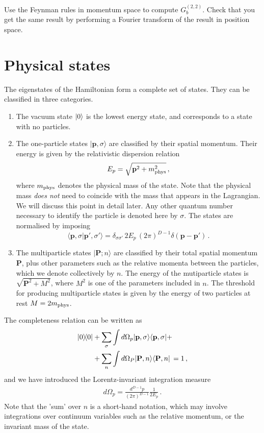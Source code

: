\documentclass[notes]{subfiles}
\begin{document}
\begin{Ex}
  Use the Feynman rules in momentum space to compute
  $G^{(2,2)}_b$. Check that you get the same result by performing a
  Fourier transform of the result in position space.
\end{Ex}

\section{Physical states}
\label{sec:physical-states}

The eigenstates of the Hamiltonian form a complete set of states. They
can be classified in three categories.
\begin{enumerate}
\item The vacuum state $\ket{0}$ is the lowest energy state, and
  corresponds to a state with no particles.
\item The one-particle states $|\mathbf{p},\sigma\rangle$ are
  classified by their spatial momentum. Their energy is given by the
  relativistic dispersion relation 
  \begin{equation}
    \label{eq:RelDispRel}
    E_p = \sqrt{\mathbf{p}^2 + m_\mathrm{phys}^2}\, ,
  \end{equation}
  where $m_\mathrm{phys}$ denotes the physical mass of the state. Note that the
  physical mass \emph{does not} need to coincide with the mass that
  appears in the Lagrangian. We will discuss this point in detail
  later. Any other quantum number necessary to identify the particle
  is denoted here by $\sigma$.  The states are normalised by imposing
\begin{equation}
  \label{eq:OnePartNorm}
  \langle \mathbf{p}, \sigma | \mathbf{p}', \sigma' \rangle =
  \delta_{\sigma\sigma'}\, 
  2 E_p\, (2\pi)^{D-1} \delta(\mathbf{p}-\mathbf{p}')\, .
\end{equation}
\item The multiparticle states $|\mathbf{P};n\rangle$ are classified
  by their total spatial momentum $\mathbf{P}$, plus other parameters
  such as the relative momenta between the particles, which we denote
  collectively by $n$. The energy of the mutiparticle states is
  $\sqrt{\mathbf{P}^2+M^2}$, where $M^2$ is one of the parameters
  included in $n$. The threshold for producing multiparticle states is
  given by the energy of two particles at rest $M=2m_\mathrm{phys}$.
\end{enumerate}
The completeness relation can be written as
\begin{align}
  \ketbra{0}{0}
  &+ \sum_\sigma \int d\Omega_p 
    |\mathbf{p},\sigma\rangle \langle \mathbf{p},\sigma| + \nonumber
  \\
  &+ \sum_n \int d\Omega_P 
    |\mathbf{P},n\rangle \langle \mathbf{P},n|\, = 1\, ,
\end{align}
and we have introduced the Lorentz-invariant integration measure
\begin{align}
  d\Omega_p = \frac{d^{D-1}p}{(2\pi)^{D-1}}
    \frac{1}{2E_p} \, .
\end{align}
Note that the 'sum' over $n$ is a short-hand notation, which may
involve integrations over continuum variables such as the relative
momentum, or the invariant mass of the state. 
\end{document}
